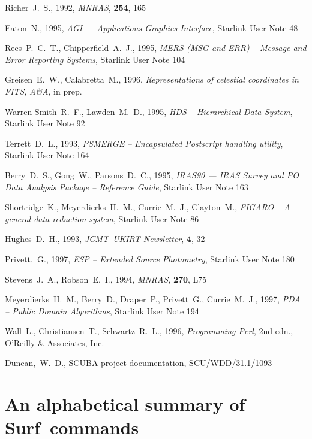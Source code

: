 \documentclass[twoside,11pt]{article}
\newcommand{\scusoft}          {{\sc Surf}}
\newcommand{\htmladdnormallink}[2]{#1}
\newcommand{\xref}[3]{#1}
\newcommand{\xlabel}[1]{}
\begin{document}
\begin{thebibliography}{}
Richer~J.~S., 1992, {\it MNRAS}, {\bf 254}, 165

Eaton~N., 1995, {\it AGI --- Applications Graphics Interface},
\xref{Starlink User Note 48}{sun48}{}

Rees~P.~C.~T., Chipperfield~A.~J., 1995, {\it MERS (MSG and ERR) -- Message
and Error Reporting Systems}, \xref{Starlink User Note 104}{sun104}{}

Greisen~E.~W., Calabretta~M., 1996, {\it Representations of celestial
coordinates in FITS}, {\it A\&A}, in prep.

Warren-Smith~R.~F., Lawden~M.~D., 1995, {\it HDS -- Hierarchical Data System},
\xref{Starlink User Note 92}{sun92}{}

Terrett~D.~L., 1993, {\it PSMERGE -- Encapsulated Postscript handling utility},
\xref{Starlink User Note 164}{sun164}{}

Berry~D.~S., Gong~W., Parsons~D.~C., 1995, {\it IRAS90 --- IRAS Survey and PO
Data Analysis Package -- Reference Guide}, \xref{Starlink User Note
163}{sun163}{} 

Shortridge~K., Meyerdierks~H.~M., Currie~M.~J., Clayton~M., 
{\it FIGARO -- A general data reduction system}, 
\xref{Starlink User Note 86}{sun86}{}

Hughes~D.~H., 1993, {\it JCMT--UKIRT Newsletter}, {\bf 4}, 32

Privett,~G., 1997, {\it ESP -- Extended Source Photometry},
\xref{Starlink User Note 180}{sun180}{}


Stevens~J.~A.,  Robson~E.~I.,  1994, {\it  MNRAS}, {\bf 270}, L75


Meyerdierks~H.~M., Berry~D., Draper~P., Privett~G., Currie~M.~J., 1997,
\textit{PDA -- Public Domain Algorithms}, 
\xref{Starlink User Note 194}{sun194}{}

Wall~L., Christiansen~T., Schwartz~R.~L., 1996, 
\htmladdnormallink{\textit{Programming Perl}}{http://www.perl.org/}, 2nd
edn., \htmladdnormallink{O'Reilly \& Associates, Inc.}{http://www.ora.com/}

Duncan,~W.~D., SCUBA project documentation, SCU/WDD/31.1/1093


\end{thebibliography}


\appendix

\clearpage

\section{\xlabel{alphabet}An alphabetical summary of \scusoft\ commands\label{alphabet}}
\end{document}
